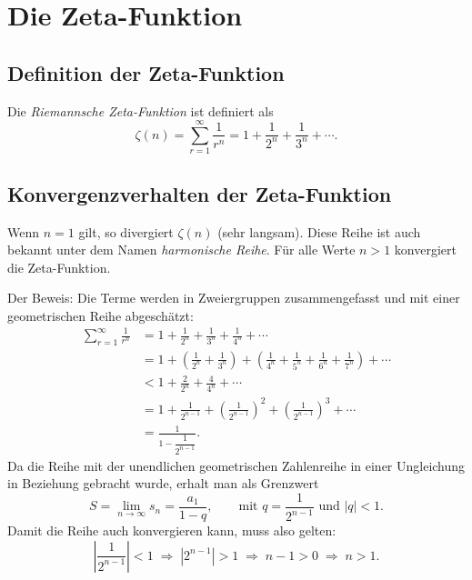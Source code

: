 %
%
%
%
\section{Die Zeta-Funktion}
\label{basel:section:zeta}

\subsection{Definition der Zeta-Funktion}
\label{basel:subsection:zetadef}

Die \emph{Riemannsche Zeta-Funktion} ist definiert als
\begin{equation}
    \zeta(n)
    =
    \sum_{r=1}^{\infty} \frac{1}{r^n}
    =
    1 + \frac{1}{2^n} + \frac{1}{3^n} + \cdots.
    \label{basel:equation:zetadef}
\end{equation}

\subsection{Konvergenzverhalten der Zeta-Funktion}
\label{basel:subsection:zetakonvergenz}

Wenn $n = 1$ gilt, so divergiert $\zeta(n)$ (sehr langsam).
Diese Reihe ist auch bekannt unter dem Namen \emph{harmonische Reihe}.
Für alle Werte $n > 1$ konvergiert die Zeta-Funktion.

Der Beweis:
Die Terme werden in Zweiergruppen zusammengefasst und mit einer geometrischen
Reihe abgeschätzt:
\begin{align*}
    \sum_{r=1}^{\infty} \frac{1}{r^n}
    &=
    1 + \frac{1}{2^n} + \frac{1}{3^n} + \frac{1}{4^n} + \cdots
    \\
    &=
    1
    + \left(\frac{1}{2^n} + \frac{1}{3^n}\right)
    + \left(\frac{1}{4^n} + \frac{1}{5^n} + \frac{1}{6^n} + \frac{1}{7^n}\right)
    + \cdots
    \\
    &<
    1 + \frac{2}{2^n} + \frac{4}{4^n} + \cdots
    \\
    &=
    1
    + \frac{1}{2^{n-1}}
    + \left(\frac{1}{2^{n-1}}\right)^{\!2}
    + \left(\frac{1}{2^{n-1}}\right)^{\!3}
    + \cdots
    \\
    &=
    \frac{1}{1 - \dfrac{1}{2^{n-1}}}.
\end{align*}
Da die Reihe mit der unendlichen geometrischen Zahlenreihe in einer Ungleichung
in Beziehung gebracht wurde, erhalt man als Grenzwert
\[
    S
    =
    \lim_{n \to \infty} s_n
    =
    \frac{a_1}{1-q},
    \qquad
    \text{mit } q = \frac{1}{2^{n-1}}
    \text{ und } |q| < 1.
\]
Damit die Reihe auch konvergieren kann, muss also gelten:
\[
    \left| \frac{1}{2^{n-1}} \right| < 1
    \;\Rightarrow\;
    |2^{n-1}| > 1
    \;\Rightarrow\;
    n - 1 > 0
    \;\Rightarrow\;
    n > 1.
\]

